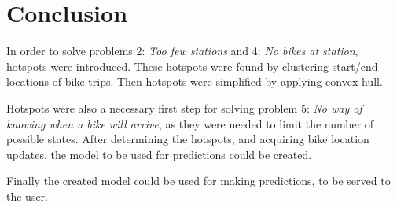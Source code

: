 \section{Conclusion}
In order to solve problems 2: \textit{Too few stations} and 4: \textit{No bikes at station}, hotspots were introduced.
These hotspots were found by clustering start/end locations of bike trips.
Then hotspots were simplified by applying convex hull.

Hotspots were also a necessary first step for solving problem 5: \textit{No way of knowing when a bike will arrive}, as they were needed to limit the number of possible states.
After determining the hotspots, and acquiring bike location updates, the model to be used for predictions could be created.

Finally the created model could be used for making predictions, to be served to the user.
